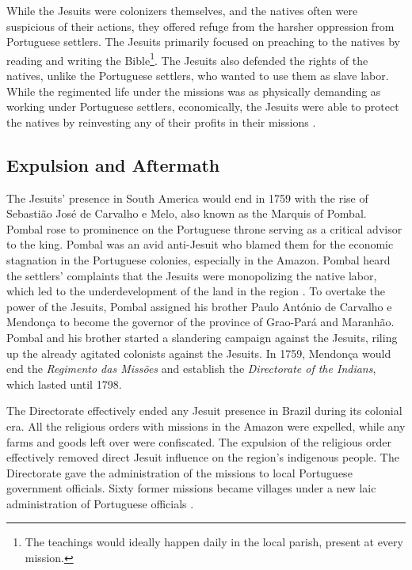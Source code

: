 \documentclass{article}
\begin{document}
While the Jesuits were colonizers themselves, and the natives often were suspicious of their actions, they offered refuge from the harsher oppression from Portuguese settlers. The Jesuits primarily focused on preaching to the natives by reading and writing the Bible\footnote{The teachings would ideally happen daily in the local parish, present at every mission.}. 
The Jesuits also defended the rights of the natives, unlike the Portuguese settlers, who wanted to use them as slave labor.
While the regimented life under the missions was as physically demanding as working under Portuguese settlers, economically, the Jesuits were able to protect the natives by reinvesting any of their profits in their missions \parencite[p.~235]{Azevedo1930-ir}.

\subsection{Expulsion and Aftermath}

The Jesuits' presence in South America would end in 1759 with the rise of Sebastião José de Carvalho e Melo, also known as the Marquis of Pombal. Pombal rose to prominence on the Portuguese throne serving as a critical advisor to the king.  
Pombal was an avid anti-Jesuit who blamed them for the economic stagnation in the Portuguese colonies, especially in the Amazon. 
Pombal heard the settlers' complaints that the Jesuits were monopolizing the native labor, which led to the underdevelopment of the land in the region \parencite{Parker1989-ul}.
To overtake the power of the Jesuits, Pombal assigned his brother Paulo António de Carvalho e Mendonça to become the governor of the province of Grao-Pará and Maranhão. 
Pombal and his brother started a slandering campaign against the Jesuits, riling up the already agitated colonists against the Jesuits. 
In 1759, Mendonça would end the \textit{Regimento das Missões} and establish the \textit{Directorate of the Indians}, which lasted until 1798.

The Directorate effectively ended any Jesuit presence in Brazil during its colonial era.
All the religious orders with missions in the Amazon were expelled, while any farms and goods left over were confiscated. 
The expulsion of the religious order effectively removed direct Jesuit influence on the region's indigenous people. 
The Directorate gave the administration of the missions to local Portuguese government officials. 
Sixty former missions became villages under a new laic administration of Portuguese officials \parencite{Chambouleyron2019-tm}. 
\end{document}
